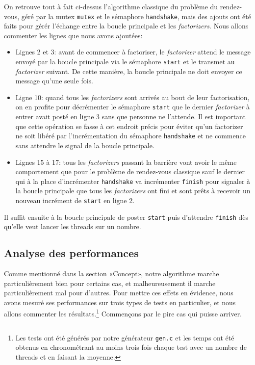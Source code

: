 \documentclass[a4paper,10pt]{article}
\begin{document}
On retrouve tout à fait ci-dessus l'algorithme classique du problème du rendez-vous, géré par la mutex \texttt{mutex} et le sémaphore \texttt{handshake}, mais des ajouts ont été faits pour gérér l'échange entre la boucle principale et les \emph{factorizers}. Nous allons commenter les lignes que nous avons ajoutées:
\begin{itemize}
    \item Lignes 2 et 3: avant de commencer à factoriser, le \emph{factorizer} attend le message envoyé par la boucle principale via le sémaphore \texttt{start} et le transmet au \emph{factorizer} suivant. De cette manière, la boucle principale ne doit envoyer ce message qu'une seule fois.
    \item Ligne 10: quand tous les \emph{factorizers} sont arrivés au bout de leur factorisation, on en profite pour décrémenter le sémaphore \texttt{start} que le dernier \emph{factorizer} à entrer avait posté en ligne 3 sans que personne ne l'attende. Il est important que cette opération se fasse à cet endroit précis pour éviter qu'un factorizer ne soit libéré par l'incrémentation du sémaphore \texttt{handshake} et ne commence sans attendre le signal de la boucle principale.
    \item Lignes 15 à 17: tous les \emph{factorizers} passant la barrière vont avoir le même comportement que pour le problème de rendez-vous classique sauf le dernier qui à la place d'incrémenter \texttt{handshake} va incrémenter \texttt{finish} pour signaler à la boucle principale que tous les \emph{factorizers} ont fini et sont prêts à recevoir un nouveau incrément de \texttt{start} en ligne 2.
\end{itemize}

Il suffit ensuite à la boucle principale de poster \texttt{start} puis d'attendre \texttt{finish} dès qu'elle veut lancer les threads sur un nombre.

\subsection*{Analyse des performances}

Comme mentionné dans la section «Concept», notre algorithme marche particulièrement bien pour certains cas, et malheureusement il marche particulièrement mal pour d'autres. Pour mettre ces effets en évidence, nous avons mesuré ses performances sur trois types de tests en particulier, et nous allons commenter les résultats.\footnote{Les tests ont été générés par notre générateur \texttt{gen.c} et les temps ont été obtenus en chronométrant au moins trois fois chaque test avec un nombre de threads et en faisant la moyenne.} Commençons par le pire cas qui puisse arriver.
\end{document}
